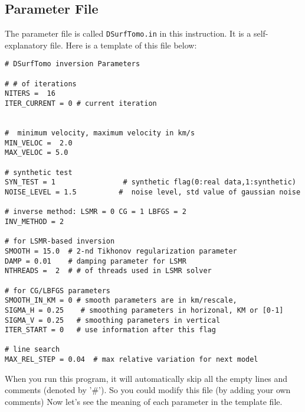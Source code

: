 \documentclass[UTF8]{article}
\begin{document}
\subsection{Parameter File} \label{DSurfTomo}
The parameter file is called \texttt{DSurfTomo.in}
in this instruction. It is a self-explanatory file.
Here is a template of this file below:
\\
\begin{lstlisting}
# DSurfTomo inversion Parameters

# # of iterations
NITERS =  16
ITER_CURRENT = 0 # current iteration


#  minimum velocity, maximum velocity in km/s
MIN_VELOC =  2.0
MAX_VELOC = 5.0 

# synthetic test
SYN_TEST = 1                # synthetic flag(0:real data,1:synthetic)
NOISE_LEVEL = 1.5          #  noise level, std value of gaussian noise

# inverse method: LSMR = 0 CG = 1 LBFGS = 2
INV_METHOD = 2

# for LSMR-based inversion 
SMOOTH = 15.0  # 2-nd Tikhonov regularization parameter
DAMP = 0.01    # damping parameter for LSMR
NTHREADS =  2  # # of threads used in LSMR solver 

# for CG/LBFGS parameters 
SMOOTH_IN_KM = 0 # smooth parameters are in km/rescale, 
SIGMA_H = 0.25    # smoothing parameters in horizonal, KM or [0-1]  
SIGMA_V = 0.25   # smoothing parameters in vertical
ITER_START = 0   # use information after this flag

# line search 
MAX_REL_STEP = 0.04  # max relative variation for next model

\end{lstlisting}
When you run this program, it will automatically skip
all the empty lines and comments (denoted by '\#'). So you 
could modify this file (by adding your own comments) Now let's
see the meaning of each parameter in the template file.
\end{document}
